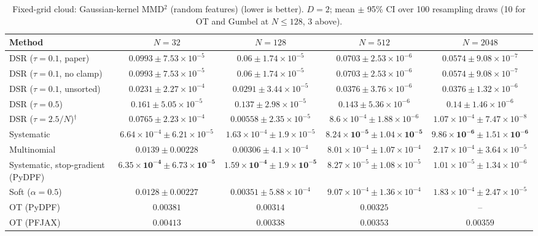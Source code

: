 \begin{table}[H]
\centering
\small
\caption{Fixed-grid cloud: Gaussian-kernel MMD$^2$ (random features) (lower is better). $D{=}2$; mean $\pm$ 95\% CI over 100 resampling draws (10 for OT and Gumbel at $N\le128$, 3 above).}
\label{tab:static-fixed-rff_mmd2}
\begin{adjustbox}{max width=\linewidth}
\begin{tabular}{lcccc}
\toprule
Method & $N{=}32$ & $N{=}128$ & $N{=}512$ & $N{=}2048$ \\
\midrule
DSR ($\tau{=}0.1$, paper) & $0.0993\pm7.53\times10^{-5}$ & $0.06\pm1.74\times10^{-5}$ & $0.0703\pm2.53\times10^{-6}$ & $0.0574\pm9.08\times10^{-7}$ \\
DSR ($\tau{=}0.1$, no clamp) & $0.0993\pm7.53\times10^{-5}$ & $0.06\pm1.74\times10^{-5}$ & $0.0703\pm2.53\times10^{-6}$ & $0.0574\pm9.08\times10^{-7}$ \\
DSR ($\tau{=}0.1$, unsorted) & $0.0231\pm2.27\times10^{-4}$ & $0.0291\pm3.44\times10^{-5}$ & $0.0376\pm3.76\times10^{-6}$ & $0.0376\pm1.32\times10^{-6}$ \\
DSR ($\tau{=}0.5$) & $0.161\pm5.05\times10^{-5}$ & $0.137\pm2.98\times10^{-5}$ & $0.143\pm5.36\times10^{-6}$ & $0.14\pm1.46\times10^{-6}$ \\
DSR ($\tau{=}2.5/N$)$^\dagger$ & $0.0765\pm2.23\times10^{-4}$ & $0.00558\pm2.35\times10^{-5}$ & $8.6\times10^{-4}\pm1.88\times10^{-6}$ & $1.07\times10^{-4}\pm7.47\times10^{-8}$ \\
\midrule
Systematic & $6.64\times10^{-4}\pm6.21\times10^{-5}$ & $1.63\times10^{-4}\pm1.9\times10^{-5}$ & $\mathbf{8.24\times10^{-5}\pm1.04\times10^{-5}}$ & $\mathbf{9.86\times10^{-6}\pm1.51\times10^{-6}}$ \\
Multinomial & $0.0139\pm0.00228$ & $0.00306\pm4.1\times10^{-4}$ & $8.01\times10^{-4}\pm1.07\times10^{-4}$ & $2.17\times10^{-4}\pm3.64\times10^{-5}$ \\
Systematic, stop-gradient (PyDPF) & $\mathbf{6.35\times10^{-4}\pm6.73\times10^{-5}}$ & $\mathbf{1.59\times10^{-4}\pm1.9\times10^{-5}}$ & $8.27\times10^{-5}\pm1.08\times10^{-5}$ & $1.01\times10^{-5}\pm1.34\times10^{-6}$ \\
Soft ($\alpha{=}0.5$) & $0.0128\pm0.00227$ & $0.00351\pm5.88\times10^{-4}$ & $9.07\times10^{-4}\pm1.36\times10^{-4}$ & $1.83\times10^{-4}\pm2.47\times10^{-5}$ \\
OT (PyDPF) & $0.00381$ & $0.00314$ & $0.00325$ & -- \\
OT (PFJAX) & $0.00413$ & $0.00338$ & $0.00353$ & $0.00359$ \\

\end{tabular}
\end{adjustbox}
\end{table}
